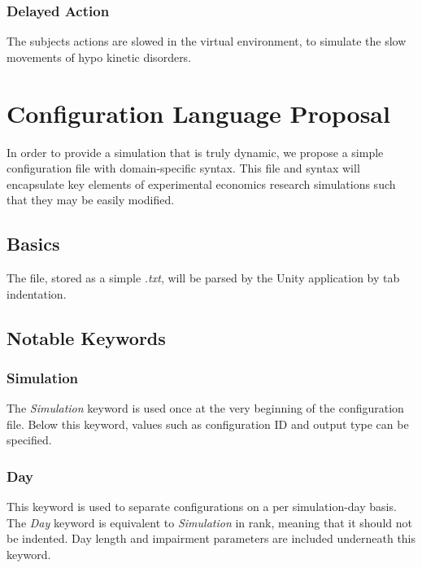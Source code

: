 \documentclass{article}
\begin{document}
\subsubsection*{Delayed Action}
The subjects actions are slowed in the virtual environment, to simulate the slow movements of hypo kinetic disorders.

\section*{Configuration Language Proposal}

In order to provide a simulation that is truly dynamic, we propose a simple configuration file with domain-specific syntax. This file and syntax will encapsulate key elements of experimental economics research simulations such that they may be easily modified.

\subsection*{Basics}

The file, stored as a simple \textit{.txt}, will be parsed by the Unity application by tab indentation. 


\subsection*{Notable Keywords}

\subsubsection*{Simulation}

The \textit{Simulation} keyword is used once at the very beginning of the configuration file. Below this keyword, values such as configuration ID and output type can be specified.

\subsubsection*{Day}

This keyword is used to separate configurations on a per simulation-day basis. The \textit{Day} keyword is equivalent to \textit{Simulation} in rank, meaning that it should not be indented. Day length and impairment parameters are included underneath this keyword.
\end{document}
